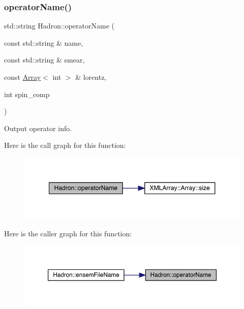 \subsubsection{\texorpdfstring{operatorName()}{operatorName()}}
{\footnotesize\ttfamily std\+::string Hadron\+::operator\+Name (\begin{DoxyParamCaption}\item[{const std\+::string \&}]{name,  }\item[{const std\+::string \&}]{smear,  }\item[{const \mbox{\hyperlink{classXMLArray_1_1Array}{Array}}$<$ int $>$ \&}]{lorentz,  }\item[{int}]{spin\+\_\+comp }\end{DoxyParamCaption})}



Output operator info. 

Here is the call graph for this function\+:\nopagebreak
\begin{figure}[H]
\begin{center}
\leavevmode
\includegraphics[width=348pt]{d1/daf/namespaceHadron_a8f8a77c02a6415ffc31d2a300f59e6a6_cgraph}
\end{center}
\end{figure}
Here is the caller graph for this function\+:\nopagebreak
\begin{figure}[H]
\begin{center}
\leavevmode
\includegraphics[width=350pt]{d1/daf/namespaceHadron_a8f8a77c02a6415ffc31d2a300f59e6a6_icgraph}
\end{center}
\end{figure}
\mbox{\label{namespaceHadron_a8bd515c92e3dbbe8e9741b25d71edc60}} 
